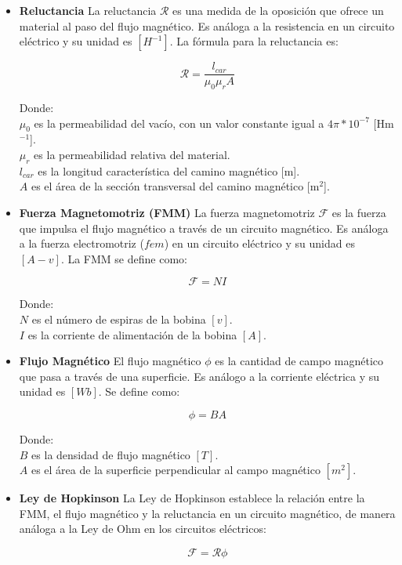 \begin{itemize}
    \item \textbf{Reluctancia}
    La reluctancia \(\mathcal{R}\) es una medida de la oposición que ofrece un material al paso del flujo magnético. Es análoga a la resistencia en un circuito eléctrico y su unidad es \([H^{-1}]\). La fórmula para la reluctancia es:
    
    \[\mathcal{R}=\frac{l_{car}}{\mu_0\mu_r A}\] 
    
    Donde:\\
    \(\mu_0\) es la permeabilidad del vacío, con un valor constante igual a \(4\pi*10^{-7}\) [Hm\(^{-1}\)].\\
    \(\mu_r\) es la permeabilidad relativa del material.\\
    \(l_{car}\) es la longitud característica del camino magnético [m].\\
    \(A\) es el área de la sección transversal del camino magnético [m\(^2\)].\\

    \item \textbf{Fuerza Magnetomotriz (FMM)}
    La fuerza magnetomotriz \(\mathcal{F}\) es la fuerza que impulsa el flujo magnético a través de un circuito magnético. Es análoga a la fuerza electromotriz (\(fem\)) en un circuito eléctrico y su unidad es \([A-v]\). La FMM se define como:
    
    \[\mathcal{F}=NI\]
    
    Donde:\\
    \(N\) es el número de espiras de la bobina \([v]\).\\
    \(I\) es la corriente de alimentación de la bobina \([A]\).\\

    \item \textbf{Flujo Magnético}
    El flujo magnético \(\phi\) es la cantidad de campo magnético que pasa a través de una superficie. Es análogo a la corriente eléctrica y su unidad es \([Wb]\). Se define como:
    
    \[\phi = BA\]
    
    Donde:\\
    \(B\) es la densidad de flujo magnético \([T]\).\\
    \(A\) es el área de la superficie perpendicular al campo magnético \([m^2]\).\\

    \item \textbf{Ley de Hopkinson}
    La Ley de Hopkinson establece la relación entre la FMM, el flujo magnético y la reluctancia en un circuito magnético, de manera análoga a la Ley de Ohm en los circuitos eléctricos:
    
    \[\mathcal{F}=\mathcal{R}\phi\]
\end{itemize}

